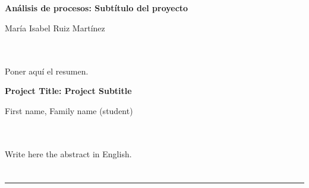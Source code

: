 \chapter*{}


%



\cleardoublepage
\thispagestyle{empty}

\begin{center}
{\large\bfseries Análisis de procesos: Subtítulo del proyecto}\\
\end{center}
\begin{center}
María Isabel Ruiz Martínez\\
\end{center}

\\

\vspace{0.7cm}
\\

Poner aquí el resumen.
\cleardoublepage


\thispagestyle{empty}


\begin{center}
{\large\bfseries Project Title: Project Subtitle}\\
\end{center}
\begin{center}
First name, Family name (student)\\
\end{center}

\\

\vspace{0.7cm}
\\

Write here the abstract in English.

\chapter*{}
\thispagestyle{empty}

\noindent\rule[-1ex]{\textwidth}{2pt}\\[4.5ex]

